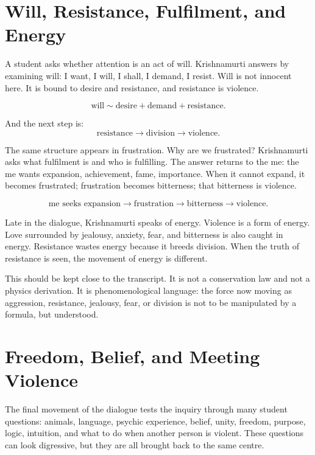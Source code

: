 \section{Will, Resistance, Fulfilment, and Energy}

A student asks whether attention is an act of will. Krishnamurti answers by examining will: I want, I will, I shall, I demand, I resist. Will is not innocent here. It is bound to desire and resistance, and resistance is violence.

\begin{equation}
\text{will}
\sim
\text{desire}+\text{demand}+\text{resistance}.
\end{equation}

And the next step is:
\begin{equation}
\text{resistance}
\rightarrow
\text{division}
\rightarrow
\text{violence}.
\end{equation}

The same structure appears in frustration. Why are we frustrated? Krishnamurti asks what fulfilment is and who is fulfilling. The answer returns to the me: the me wants expansion, achievement, fame, importance. When it cannot expand, it becomes frustrated; frustration becomes bitterness; that bitterness is violence.

\begin{equation}
\text{me seeks expansion}
\rightarrow
\text{frustration}
\rightarrow
\text{bitterness}
\rightarrow
\text{violence}.
\end{equation}

Late in the dialogue, Krishnamurti speaks of energy. Violence is a form of energy. Love surrounded by jealousy, anxiety, fear, and bitterness is also caught in energy. Resistance wastes energy because it breeds division. When the truth of resistance is seen, the movement of energy is different.

This should be kept close to the transcript. It is not a conservation law and not a physics derivation. It is phenomenological language: the force now moving as aggression, resistance, jealousy, fear, or division is not to be manipulated by a formula, but understood.

\section{Freedom, Belief, and Meeting Violence}

The final movement of the dialogue tests the inquiry through many student questions: animals, language, psychic experience, belief, unity, freedom, purpose, logic, intuition, and what to do when another person is violent. These questions can look digressive, but they are all brought back to the same centre.

